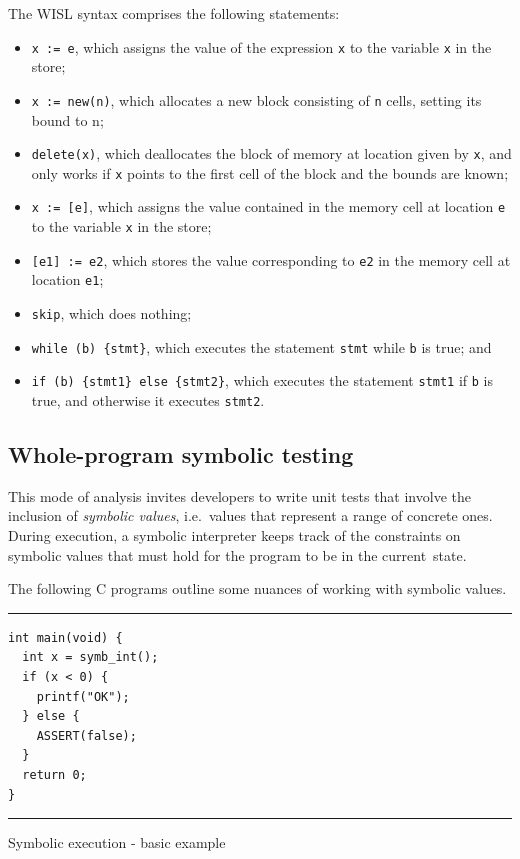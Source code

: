 The WISL syntax comprises the following statements:
\begin{itemize}
  \item \texttt{x := e}, which assigns the value of the expression \texttt{x} to the variable \texttt{x} in the store;
  \item \texttt{x := new(n)}, which allocates a new block consisting of \texttt{n} cells, setting its bound to n;
  \item \texttt{delete(x)}, which deallocates the block of memory at location given by \texttt{x}, and only works if \texttt{x} points to the first cell of the block and the bounds are known;
  \item \texttt{x := [e]}, which assigns the value contained in the memory cell at location \texttt{e} to the variable \texttt{x} in the store;
  \item \texttt{[e1] := e2}, which stores the value corresponding to \texttt{e2} in the memory cell at location \texttt{e1};
  \item \texttt{skip}, which does nothing;
  \item \texttt{while (b) \{stmt\}}, which executes the statement \texttt{stmt} while \texttt{b} is true; and
  \item \texttt{if (b) \{stmt1\} else \{stmt2\}}, which executes the statement \texttt{stmt1} if \texttt{b} is true, and otherwise it executes \texttt{stmt2}.
\end{itemize}

\subsection{Whole-program symbolic testing}

This mode of analysis invites developers to write unit tests that involve the
inclusion of \textit{symbolic values}, i.e.\ values that represent a range of
concrete ones. During execution, a symbolic interpreter keeps track of the
constraints on symbolic values that must hold for the program to be in the
current~state.

The following C programs outline some nuances of working with symbolic values.

\begin{listing}[!ht]
\noindent\rule{\textwidth}{0.5pt}
\vspace{-0.6cm}
\begin{verbatim}
int main(void) {
  int x = symb_int();
  if (x < 0) {
    printf("OK");
  } else {
    ASSERT(false);
  }
  return 0;
}
\end{verbatim}
\vspace{-0.4cm}
\noindent\rule{\textwidth}{0.5pt}
\vspace{-0.6cm}
\caption{Symbolic execution - basic example}
\end{listing}

